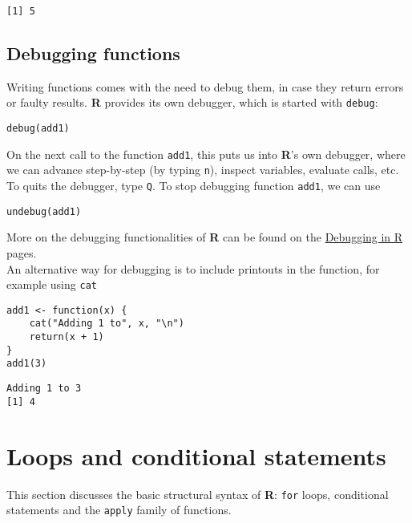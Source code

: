 \documentclass[11pt,a4paper]{article}
\begin{document}
\begin{verbatim}
[1] 5
\end{verbatim}

\subsection{Debugging functions}
\label{sec-3-2}

Writing functions comes with the need to debug them, in case they return errors or faulty results. \textbf{R} provides its own debugger, which is started with \verb~debug~: \\

\begin{verbatim}
debug(add1)
\end{verbatim}

On the next call to the function \verb~add1~, this puts us into \textbf{R}'s own debugger, where we can advance step-by-step (by typing \verb~n~), inspect variables, evaluate calls, etc. To quits the debugger, type \verb~Q~. To stop debugging function \verb~add1~, we can use \\

\begin{verbatim}
undebug(add1)
\end{verbatim}

More on the debugging functionalities of \textbf{R} can be found on the \href{http://www.stats.uwo.ca/faculty/murdoch/software/debuggingR/}{Debugging in R} pages. \\

An alternative way for debugging is to include printouts in the function, for example using \verb~cat~ \\

\begin{verbatim}
add1 <- function(x) {
    cat("Adding 1 to", x, "\n")
    return(x + 1)
}
add1(3)
\end{verbatim}

\begin{verbatim}
Adding 1 to 3 
[1] 4
\end{verbatim}

\section{Loops and conditional statements}
\label{sec-4}

This section discusses the basic structural syntax of \textbf{R}: \texttt{for} loops, conditional statements and the \texttt{apply} family of functions. \\
\end{document}
